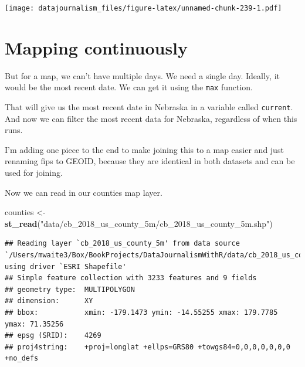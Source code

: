 \documentclass[]{book}
\newenvironment{Shaded}{\begin{snugshade}}{\end{snugshade}}
\newcommand{\DataTypeTok}[1]{\textcolor[rgb]{0.13,0.29,0.53}{#1}}
\newcommand{\DecValTok}[1]{\textcolor[rgb]{0.00,0.00,0.81}{#1}}
\newcommand{\KeywordTok}[1]{\textcolor[rgb]{0.13,0.29,0.53}{\textbf{#1}}}
\newcommand{\NormalTok}[1]{#1}
\newcommand{\OperatorTok}[1]{\textcolor[rgb]{0.81,0.36,0.00}{\textbf{#1}}}
\newcommand{\StringTok}[1]{\textcolor[rgb]{0.31,0.60,0.02}{#1}}
\begin{document}
\texttt{[image: datajournalism\_files/figure-latex/unnamed-chunk-239-1.pdf]}

\hypertarget{mapping-continuously}{%
\section{Mapping continuously}\label{mapping-continuously}}

But for a map, we can't have multiple days. We need a single day. Ideally, it would be the most recent date. We can get it using the \texttt{max} function.

\begin{Shaded}
\end{Shaded}

That will give us the most recent date in Nebraska in a variable called \texttt{current}. And now we can filter the most recent data for Nebraska, regardless of when this runs.

I'm adding one piece to the end to make joining this to a map easier and just renaming fips to GEOID, because they are identical in both datasets and can be used for joining.

\begin{Shaded}
\end{Shaded}

Now we can read in our counties map layer.

\begin{Shaded}
\begin{Highlighting}[]
\NormalTok{counties <-}\StringTok{ }\KeywordTok{st_read}\NormalTok{(}\StringTok{"data/cb_2018_us_county_5m/cb_2018_us_county_5m.shp"}\NormalTok{)}
\end{Highlighting}
\end{Shaded}

\begin{verbatim}
## Reading layer `cb_2018_us_county_5m' from data source `/Users/mwaite3/Box/BookProjects/DataJournalismWithR/data/cb_2018_us_county_5m/cb_2018_us_county_5m.shp' using driver `ESRI Shapefile'
## Simple feature collection with 3233 features and 9 fields
## geometry type:  MULTIPOLYGON
## dimension:      XY
## bbox:           xmin: -179.1473 ymin: -14.55255 xmax: 179.7785 ymax: 71.35256
## epsg (SRID):    4269
## proj4string:    +proj=longlat +ellps=GRS80 +towgs84=0,0,0,0,0,0,0 +no_defs
\end{verbatim}
\end{document}

